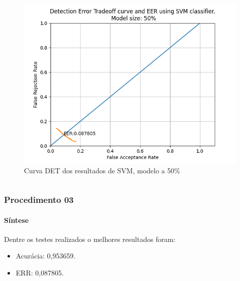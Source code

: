 \begin{frame}
{\begin{columns}
			\begin{figure}
				\centering
				\includegraphics[width=\linewidth]{../monography/images/results/det/DET_SVM_50}
				\caption{Curva DET dos resultados de SVM, modelo a 50\%}
			\end{figure}
		\end{columns}
	}
\end{frame}

\begin{frame}
	\frametitle{Procedimento 03}
	\framesubtitle{Síntese}
	\par Dentre os testes realizados o melhores resultados foram:
	\begin{itemize}
		\item Acurácia: 0,953659.
		\item ERR: 0,087805.
	\end{itemize}
\end{frame}